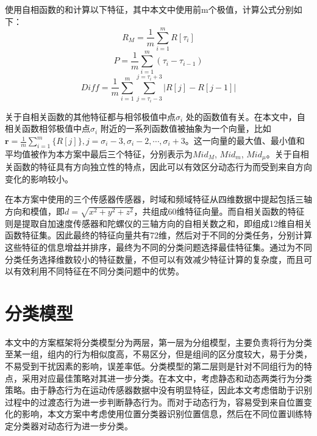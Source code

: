 \par 使用自相函数的和计算以下特征，其中本文中使用前m个极值，计算公式分别如下：
\begin{equation}
    R_M = \frac {1}{m}\sum_{i=1}^m R[\tau_i]
\end{equation}
\begin{equation}
    P = \frac{1}{m}\sum_{i=1}^m {(\tau_i-\tau_{i-1})}
\end{equation}
\begin{equation}
    Diff = \frac{1}{m}\sum_{i=1}^m \sum_{j=\tau_i-3}^{j=\tau_i+3} {|R[j]-R[j-1]|} 
\end{equation}
\par 关于自相关函数的其他特征都与相邻极值中点$\sigma_i$ 处的函数值有关。在本文中，自相关函数相邻极值中点$\sigma_i$ 附近的一系列函数值被抽象为一个向量，比如 $\textbf{r}=\frac {1}{m} \sum_{i=1}^m\{R[j]\}, j=\sigma_i-3, \sigma_i-2,\cdots,\sigma_i+3$。这一向量的最大值、最小值和平均值被作为本方案中最后三个特征，分别表示为$Mid_M$, $Mid_m$, $Mid_\mu$。关于自相关函数的特征具有方向独立性的特点，因此可以有效区分动态行为而受到来自方向变化的影响较小。
\par 在本方案中使用的三个传感器传感器，时域和频域特征从四维数据中提起包括三轴方向和模值，即$d=\sqrt{x^2+y^2+z^2}$，共组成60维特征向量。而自相关函数的特征则是提取自加速度传感器和陀螺仪的三轴方向的自相关数之和，即组成12维自相关函数特征集。因此最终的特征向量共有72维，然后对于不同的分类任务，分别计算这些特征的信息增益并排序，最终为不同的分类问题选择最佳特征集。通过为不同分类任务选择维数较小的特征数量，不但可以有效减少特征计算的复杂度，而且可以有效利用不同特征在不同分类问题中的优势。

\section{分类模型}
\par 本文中的方案框架将分类模型分为两层，第一层为分组模型，主要负责将行为分类至某一组，组内的行为相似度高，不易区分，但是组间的区分度较大，易于分类，不易受到干扰因素的影响，误差率低。分类模型的第二层则是针对不同组行为的特点，采用对应最佳策略对其进一步分类。在本文中，考虑静态和动态两类行为分类策略。由于静态行为在运动传感器数据中没有明显特征，因此本文考虑借助于识别过程中的过渡态行为进一步判断静态行为。而对于动态行为，容易受到来自位置变化的影响，本文方案中考虑使用位置分类器识别位置信息，然后在不同位置训练特定分类器对动态行为进一步分类。
